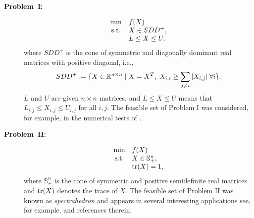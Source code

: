 \begin{description}
\item[{\bf Problem~I:}]
\begin{equation*} \label{sdd}
	\begin{array}{cl}
		\displaystyle\min     & f(X)           \\
		\mbox{s.t.} & X \in SDD^+,   \\
		            & L\leq X\leq U,
	\end{array}
\end{equation*}
where $SDD^+$ is the cone of symmetric and diagonally dominant real matrices with positive diagonal, i.e., 
$$SDD^+ :=\{X\in\mathbb{R}^{n\times n}\mid X=X^T, \; X_{i,i}\geq \displaystyle\sum_{j\neq i}|X_{i,j}| \; \forall i\},$$
$L$ and $U$ are given $n\times n$ matrices, and  $L\leq X\leq U$ means that $L_{i,j} \leq X_{i,j} \leq U_{i,j}$ for all $i,j$.
The feasible set of Problem I was considered, for example, in the numerical tests of \cite{BirginMartinezRaydan2003}.

\item[{\bf Problem~II:}]
\begin{equation*} \label{spec}
	\begin{array}{cl}
		\displaystyle\min     & f(X)                  \\
		\mbox{s.t.} & X \in \mathbb{S}^n_+, \\
		            & \textrm{tr}(X)=1,
	\end{array}
\end{equation*}
where $\mathbb{S}^n_+$ is the cone of symmetric and positive semidefinite real matrices and $\textrm{tr}(X)$ denotes the trace of $X$. 
The feasible set of Problem II was known as {\it spectrahedron} and appears in several interesting applications see, for example, \cite{allen2017linear,douglasprojected} and references therein.
\end{description}


